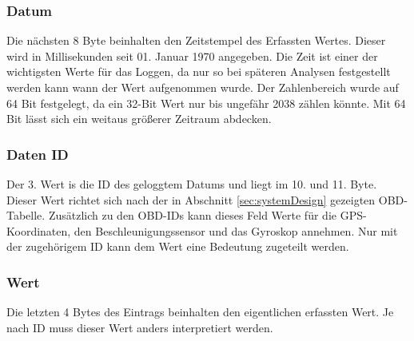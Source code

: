 \subsubsection*{Datum}
Die nächsten 8 Byte beinhalten den Zeitstempel des Erfassten Wertes. Dieser wird in Millisekunden seit 01. Januar 1970 angegeben. Die Zeit ist einer der wichtigsten Werte für das Loggen, da nur so bei späteren Analysen festgestellt werden kann wann der Wert aufgenommen wurde. Der Zahlenbereich wurde auf 64 Bit festgelegt, da ein 32-Bit Wert nur bis ungefähr 2038 zählen könnte. Mit 64 Bit lässt sich ein weitaus größerer Zeitraum abdecken.
\subsubsection*{Daten ID}
Der 3. Wert is die ID des geloggtem Datums und liegt im 10. und 11. Byte. Dieser Wert richtet sich nach der in Abschnitt \ref{sec:systemDesign} gezeigten OBD-Tabelle. Zusätzlich zu den OBD-IDs kann dieses Feld Werte für die GPS-Koordinaten, den Beschleunigungssensor und das Gyroskop annehmen.  Nur mit der zugehörigem ID kann dem Wert eine Bedeutung zugeteilt werden. 
\subsubsection*{Wert}
Die letzten 4 Bytes des Eintrags beinhalten den eigentlichen erfassten Wert. Je nach ID muss dieser Wert anders interpretiert werden.
